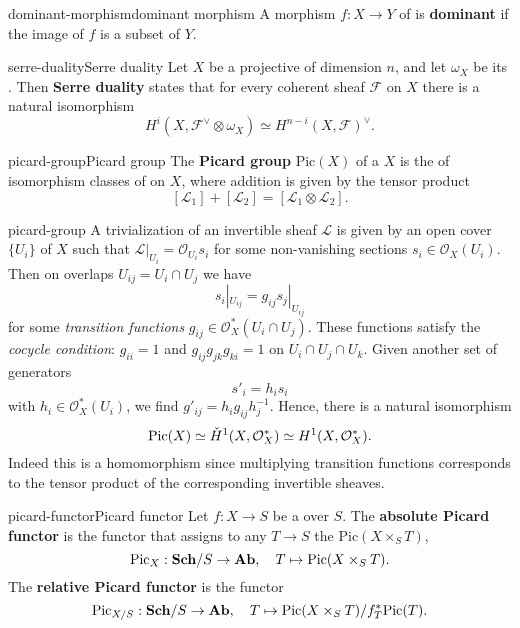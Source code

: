 \begin{topic}{dominant-morphism}{dominant morphism}
    A morphism $f : X \to Y$ of  is \textbf{dominant} if the image of $f$ is a  subset of $Y$.
\end{topic}

\begin{topic}{serre-duality}{Serre duality}
    Let $X$ be a  projective  of dimension $n$, and let $\omega_X$ be its . Then \textbf{Serre duality} states that for every coherent sheaf $\mathcal{F}$ on $X$ there is a natural isomorphism
    \[ H^i(X, \mathcal{F}^\vee \otimes \omega_X) \simeq H^{n - i}(X, \mathcal{F})^\vee . \]
\end{topic}

\begin{topic}{picard-group}{Picard group}
    The \textbf{Picard group} $\text{Pic}(X)$ of a  $X$ is the  of isomorphism classes of  on $X$, where addition is given by the tensor product
    \[ [\mathcal{L}_1] + [\mathcal{L}_2] = [\mathcal{L}_1 \otimes \mathcal{L}_2] . \]
\end{topic}

\begin{example}{picard-group}
    A trivialization of an invertible sheaf $\mathcal{L}$ is given by an open cover $\{ U_i \}$ of $X$ such that $\mathcal{L}|_{U_i} = \mathcal{O}_{U_i} s_i$ for some non-vanishing sections $s_i \in \mathcal{O}_X(U_i)$. Then on overlaps $U_{ij} = U_i \cap U_j$ we have
    \[ s_i|_{U_{ij}} = g_{ij} s_j|_{U_{ij}} \]
    for some \textit{transition functions} $g_{ij} \in \mathcal{O}_X^*(U_i \cap U_j)$. These functions satisfy the \textit{cocycle condition}: $g_{ii} = 1$ and $g_{ij} g_{jk} g_{ki} = 1$ on $U_i \cap U_j \cap U_k$. Given another set of generators
    \[ s'_i = h_i s_i \]
    with $h_i \in \mathcal{O}_X^*(U_i)$, we find $g'_{ij} = h_i g_{ij} h_j^{-1}$. Hence, there is a natural isomorphism
    \[ \textup{Pic}(X) \simeq \check{H}^1(X, \mathcal{O}_X^*) \simeq H^1(X, \mathcal{O}_X^*) . \]
    Indeed this is a homomorphism since multiplying transition functions corresponds to the tensor product of the corresponding invertible sheaves.
\end{example}

\begin{topic}{picard-functor}{Picard functor}
    Let $f : X \to S$ be a  over $S$. The \textbf{absolute Picard functor} is the functor that assigns to any $T \to S$ the  $\text{Pic}(X \times_S T)$,
    \[ \textup{Pic}_X : \textbf{Sch}/S \to \textbf{Ab}, \quad T \mapsto \textup{Pic}(X \times_S T) . \]
    The \textbf{relative Picard functor} is the functor
    \[ \textup{Pic}_{X/S} : \textbf{Sch}/S \to \textbf{Ab}, \quad T \mapsto \textup{Pic}(X \times_S T) / f_T^* \textup{Pic}(T) . \]
\end{topic}

